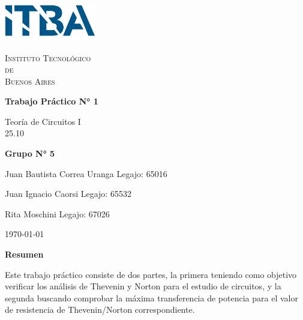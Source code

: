 \documentclass{article}
\newcommand{\Facultad}{Instituto Tecnológico \\de\\ Buenos Aires} %
\newcommand{\TPn}{Trabajo Práctico N° 1}
\begin{document}
    \begin{titlepage} %

        \begin{flushleft}
            \centering
            \includegraphics[width=0.3\textwidth]{Logo_ITBA.png}
        \end{flushleft}

        \centering
            
        {\scshape\LARGE \Facultad \par} %
        \vspace{1cm}                    %


        {\huge\bfseries \TPn \par}
        \vspace{1.5cm}
        {\Large Teoría de Circuitos I\\ 25.10 \par}
        \vfill                      %
        {\Large \bfseries Grupo N° 5 \par}
        \vspace{1cm}
        {\large Juan Bautista Correa Uranga \hfill Legajo: 65016 \par} %
        {\large Juan Ignacio Caorsi \hfill Legajo: 65532  \par}
        {\large Rita Moschini \hfill Legajo: 67026 \par} 
        \vfill
        {\large \today\par}
        \vfil

    \end{titlepage}


    {\centering \LARGE \bfseries Resumen \par}
    \vspace{0.5cm} 
        Este trabajo práctico consiste de dos partes, la primera teniendo como objetivo verificar los análisis de Thevenin y Norton para el estudio
        de circuitos, y la segunda buscando comprobar la máxima transferencia de potencia para el valor de resistencia de Thevenin/Norton correspondiente. \par
        
\end{document}
